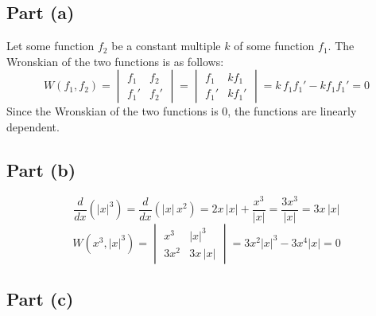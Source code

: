 \documentclass{article}
\begin{document}
\subsection*{Part (a)}
\begin{center}
Let some function \(f_2\) be a constant multiple \(k\) of some function \(f_1\). The Wronskian of the two functions is as follows:
\[W(f_1,f_2)=
\begin{vmatrix}
	f_1 & f_2 \\
	f_1' & f_2'
\end{vmatrix}
=
\begin{vmatrix}
	f_1 & kf_1 \\
	f_1' & kf_1'
\end{vmatrix}
=k\,f_1f_1'-kf_1f_1'=0\]
Since the Wronskian of the two functions is 0, the functions are linearly dependent.
\end{center}
\subsection*{Part (b)}
\[\frac{d}{dx}\left(|x|^3\right)=\frac{d}{dx}\left(|x|\,x^2\right)=2x\,|x|+\frac{x^3}{|x|}=\frac{3x^3}{|x|}=3x\,|x|\]
\[W\left(x^3,|x|^3\right)=
\begin{vmatrix}
	x^3 & |x|^3 \\
	3x^2 & 3x\,|x|
\end{vmatrix}
=3x^2|x|^3-3x^4|x|=\boxed{0}\]
\subsection*{Part (c)}
\end{document}
